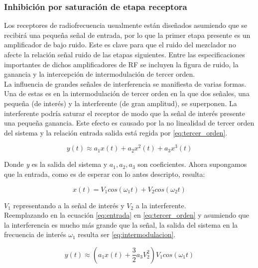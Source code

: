 \documentclass[12pt]{report}
\begin{document}
\subsubsection{Inhibición por saturación de etapa receptora}

Los receptores de radiofrecuencia usualmente están diseñados asumiendo que se recibirá una pequeña señal de entrada, por lo que la primer
etapa presente es un amplificador de bajo ruido.  Este es clave para que el ruido del mezclador no afecte la relación señal ruido de las 
etapas siguientes. Entre las especificaciones importantes de dichos amplificadores de RF se incluyen la figura de ruido, la ganancia y la 
intercepción de intermodulación de tercer orden.\\ \todo[inline, inlinewidth=4cm, noinlinepar]{[6]-[7]}
La influencia de grandes señales de interferencia se manifiesta de varias formas. Una de estas es en la intermodulación de tercer orden en 
la que dos señales, una pequeña (de interés) y la interferente (de gran amplitud), se superponen. La interferente podría saturar el receptor
de modo que la señal de interés presente una pequeña ganancia. Este efecto es causado por la no linealidad de tercer orden del sistema y la relación
entrada salida está regida por \ref{eq:tercer_orden}.

\begin{equation}\label{eq:tercer_orden}
    y(t) \approx  a_1 x(t) + a_2 x^{2}(t) + a_3 x^{3}(t) 
\end{equation}

Donde \emph{y} es la salida del sistema y \(a_1, a_2, a_3 \) son coeficientes. Ahora supongamos que la entrada, como es de esperar con lo antes
descripto, resulta:

\begin{equation}\label{eq:entrada}
    x(t)=V_1 cos(\omega_1 t)+ V_2 cos(\omega_2 t)
\end{equation}

\(V_1\) representando a la señal de interés y \(V_2\) a la interferente.\\
Reemplazando en la ecuación \ref{eq:entrada} en \ref{eq:tercer_orden} y asumiendo que la interferencia es mucho más grande que la señal, 
la salida del sistema en la frecuencia de interés \(\omega_1\) resulta ser \ref{eq:intermodulacion}.

\begin{equation}\label{eq:intermodulacion}
    y(t) \approx \left( a_1 x(t) + \frac{3}{2} a_3 V_2^{2} \right) V_1  cos(\omega_1 t)
\end{equation}
\end{document}
